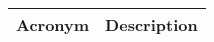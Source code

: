 \addtocounter{table}{-1}
\begin{longtable}{|p{}|p{}|}\hline
\textbf{Acronym} & \textbf{Description}  \\\hline

\end{longtable}
